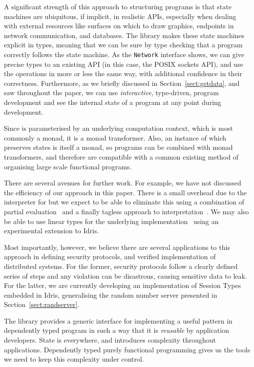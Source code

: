 A significant strength of this approach to structuring 
programs is that state machines are ubiquitous, if implicit, in realistic APIs,
especially when dealing with external resources like surfaces on which to draw
graphics, endpoints in network communication, and databases.  The \states{}
library makes these state machines explicit in types, meaning
that we can be sure by type checking that a program correctly follows the state
machine.  As the \texttt{Network} interface shows, we can give precise types to
an existing API (in this case, the POSIX sockets API), and use the operations
in more or less the same way, with additional confidence in their correctness.
%
Furthermore, as we briefly discussed in Section~\ref{sect:getdata}, and 
saw throughout the paper, we can use \emph{interactive}, type-driven, program
development and see the internal state of a program at any point during
development.

Since \states{} is parameterised by an underlying computation context, which is
most commonly a monad, it is a monad transformer.  Also, an instance of
\states{} which preserves states is itself a monad, so \states{} programs can
be combined with monad transformers, and therefore are compatible with a common
existing method of organising large scale functional programs.

There are several avenues for further work.  For example, we have not discussed
the efficiency of our approach in this paper. There is a small overhead due to
the interpreter for \states{} but we expect to be able to eliminate this using
a combination of partial evaluation~\citet{scrap-engine} and a finally tagless
approach to interpretation~\citet{Carette2009}. We may also be able to use
linear types for the underlying implementation~\citet{McBride2016} using an
experimental extension to Idris.

Most importantly, however, we believe there are several applications to
this approach in defining security protocols, and verified implementation
of distributed systems. For the former, security protocols follow a clearly
defined series of steps and any violation can be disastrous, causing
sensitive data to leak.
%
For the latter, we are currently developing an implementation of Session
Types~\citet{Honda93,Honda08} embedded in Idris, generalising the random
number server presented in Section~\ref{sect:randserver}.

The \states{} library provides a generic interface for implementing a useful
pattern in dependently typed program in such a way that it is \emph{reusable}
by application developers. State is everywhere, and introduces complexity
throughout applications. Dependently typed purely functional programming gives
us the tools we need to keep this complexity under control.
